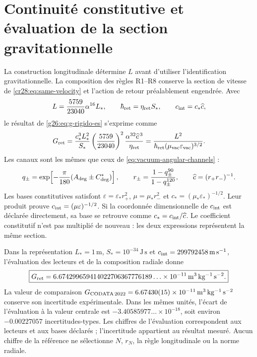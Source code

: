 \section{Continuité constitutive et évaluation de la section gravitationnelle}
\label{cr28:sec:radial-evaluation}

La construction longitudinale détermine \(L\) avant d'utiliser l'identification gravitationnelle. La composition des règles R1--R8 conserve la section de vitesse de \eqref{cr28:eq:same-velocity} et l'action de retour préalablement engendrée. Avec
\[
 L=\frac{5759}{23040}\alpha^{16}L_*,
 \qquad \hbar_{\rm ret}=\eta_{\rm ret}S_*,
 \qquad c_{\rm int}=c_*\widehat c,
\]
le résultat de \eqref{g26:eq:g-rigido-es} s'exprime comme
\begin{equation}
 G_{\rm ret}
 =\frac{c_*^3L_*^2}{S_*}
   \left(\frac{5759}{23040}\right)^2
   \frac{\alpha^{32}\widehat c^{\,3}}{\eta_{\rm ret}}
 =\frac{L^2}
 {\hbar_{\rm ret}(\mu_{\rm vac}\varepsilon_{\rm vac})^{3/2}}.
 \label{cr28:eq:g-constitutive-evaluation}
\end{equation}
Les canaux sont les mêmes que ceux de \eqref{eq:vacuum-angular-channels} :
\[
 q_\pm=\exp\!\left[-\frac{\pi}{180}(A_{\rm deg}\pm C^*_{\rm deg})\right],
 \qquad r_\pm=\frac{1-q_\pm^{90}}{1-q_\pm^{120}},
 \qquad \widehat c=(r_+r_-)^{-1}.
\]
Les bases constitutives satisfont \(\varepsilon=\varepsilon_*r_+^2\), \(\mu=\mu_*r_-^2\) et \(c_*=(\mu_*\varepsilon_*)^{-1/2}\). Leur produit prouve \(c_{\rm int}=(\mu\varepsilon)^{-1/2}\). Si la coordonnée dimensionnelle de \(c_{\rm int}\) est déclarée directement, sa base se retrouve comme \(c_*=c_{\rm int}/\widehat c\). Le coefficient constitutif n'est pas multiplié de nouveau : les deux expressions représentent la même section.

Dans la représentation \(L_*=1\,\mathrm m\), \(S_*=10^{-34}\,\mathrm{J\,s}\) et \(c_{\rm int}=299792458\,\mathrm{m\,s^{-1}}\), l'évaluation des lecteurs et de la composition radiale donne
\begin{equation}
 \boxed{
 G_{\rm ret}
 =6.674299659414022706367776189\ldots\times10^{-11}
 \,\mathrm{m^3\,kg^{-1}\,s^{-2}}.}
 \label{cr28:eq:g-evaluation}
\end{equation}
La valeur de comparaison \(G_{\rm CODATA\,2022}=6.67430(15)\times10^{-11}\,
\mathrm{m^3\,kg^{-1}\,s^{-2}}\) conserve son incertitude expérimentale. Dans les mêmes unités, l'écart de l'évaluation à la valeur centrale est \(-3.40585977\ldots\times10^{-18}\), soit environ \(-0.00227057\) incertitudes-types. Les chiffres de l'évaluation correspondent aux lecteurs et aux bases déclarés ; l'incertitude appartient au résultat mesuré. Aucun chiffre de la référence ne sélectionne \(N\), \(r_N\), la règle longitudinale ou la norme radiale.

